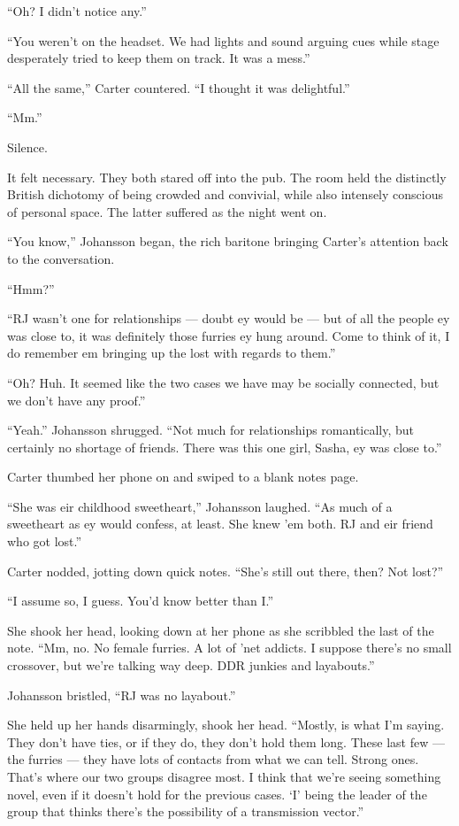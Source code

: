 ``Oh? I didn't notice any.''

``You weren't on the headset. We had lights and sound arguing cues while stage desperately tried to keep them on track. It was a mess.''

``All the same,'' Carter countered. ``I thought it was delightful.''

``Mm.''

Silence.

It felt necessary. They both stared off into the pub. The room held the distinctly British dichotomy of being crowded and convivial, while also intensely conscious of personal space. The latter suffered as the night went on.

``You know,'' Johansson began, the rich baritone bringing Carter's attention back to the conversation.

``Hmm?''

``RJ wasn't one for relationships — doubt ey would be — but of all the people ey was close to, it was definitely those furries ey hung around. Come to think of it, I do remember em bringing up the lost with regards to them.''

``Oh? Huh. It seemed like the two cases we have may be socially connected, but we don't have any proof.''

``Yeah.'' Johansson shrugged. ``Not much for relationships romantically, but certainly no shortage of friends. There was this one girl, Sasha, ey was close to.''

Carter thumbed her phone on and swiped to a blank notes page.

``She was eir childhood sweetheart,'' Johansson laughed. ``As much of a sweetheart as ey would confess, at least. She knew 'em both. RJ and eir friend who got lost.''

Carter nodded, jotting down quick notes. ``She's still out there, then? Not lost?''

``I assume so, I guess. You'd know better than I.''

She shook her head, looking down at her phone as she scribbled the last of the note. ``Mm, no. No female furries. A lot of 'net addicts. I suppose there's no small crossover, but we're talking way deep. DDR junkies and layabouts.''

Johansson bristled, ``RJ was no layabout.''

She held up her hands disarmingly, shook her head. ``Mostly, is what I'm saying. They don't have ties, or if they do, they don't hold them long. These last few — the furries — they have lots of contacts from what we can tell. Strong ones. That's where our two groups disagree most. I think that we're seeing something novel, even if it doesn't hold for the previous cases. `I' being the leader of the group that thinks there's the possibility of a transmission vector.''

